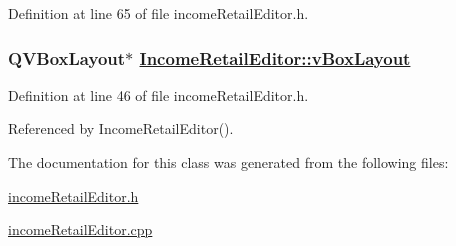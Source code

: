 Definition at line 65 of file income\-Retail\-Editor.h.\hypertarget{classIncomeRetailEditor_r3}{
\subsubsection[vBoxLayout]{\setlength{\rightskip}{0pt plus 5cm}QVBox\-Layout$\ast$ \hyperlink{classIncomeRetailEditor_r3}{Income\-Retail\-Editor::v\-Box\-Layout}}}
\label{classIncomeRetailEditor_r3}


Definition at line 46 of file income\-Retail\-Editor.h.

Referenced by Income\-Retail\-Editor().

The documentation for this class was generated from the following files:\begin{CompactItemize}
\item 
\hyperlink{incomeRetailEditor_8h}{income\-Retail\-Editor.h}\item 
\hyperlink{incomeRetailEditor_8cpp}{income\-Retail\-Editor.cpp}\end{CompactItemize}
